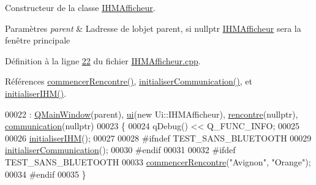 Constructeur de la classe \hyperlink{class_i_h_m_afficheur}{I\+H\+M\+Afficheur}. 


\begin{DoxyParams}{Paramètres}
{\em parent} & L\textquotesingle{}adresse de l\textquotesingle{}objet parent, si nullptr \hyperlink{class_i_h_m_afficheur}{I\+H\+M\+Afficheur} sera la fenêtre principale \\
\hline
\end{DoxyParams}


Définition à la ligne \hyperlink{_i_h_m_afficheur_8cpp_source_l00022}{22} du fichier \hyperlink{_i_h_m_afficheur_8cpp_source}{I\+H\+M\+Afficheur.\+cpp}.



Références \hyperlink{_i_h_m_afficheur_8cpp_source_l00090}{commencer\+Rencontre()}, \hyperlink{_i_h_m_afficheur_8cpp_source_l00074}{initialiser\+Communication()}, et \hyperlink{_i_h_m_afficheur_8cpp_source_l00056}{initialiser\+I\+H\+M()}.


\begin{DoxyCode}
00022                                           : \hyperlink{class_q_main_window}{QMainWindow}(parent), \hyperlink{class_i_h_m_afficheur_a26ca43f1ff87b1caa2191adcce444d23}{ui}(\textcolor{keyword}{new} Ui::IHMAfficheur), 
      \hyperlink{class_i_h_m_afficheur_aef34d340f7ea30f049a98efc47bd9779}{rencontre}(\textcolor{keyword}{nullptr}), \hyperlink{class_i_h_m_afficheur_a331b5544e96cc908336a1486b52c379b}{communication}(\textcolor{keyword}{nullptr})
00023 \{
00024     qDebug() << Q\_FUNC\_INFO;
00025 
00026     \hyperlink{class_i_h_m_afficheur_a119539fa51bf2e091e77faedf82eb146}{initialiserIHM}();
00027 
00028 \textcolor{preprocessor}{    #ifndef TEST\_SANS\_BLUETOOTH}
00029     \hyperlink{class_i_h_m_afficheur_ab7a8db8e7cfa6dc86ab59a07ede75298}{initialiserCommunication}();
00030 \textcolor{preprocessor}{    #endif}
00031 
00032 \textcolor{preprocessor}{    #ifdef TEST\_SANS\_BLUETOOTH}
00033     \hyperlink{class_i_h_m_afficheur_ad2dc0742d9cdda731a16c570fd6f2434}{commencerRencontre}(\textcolor{stringliteral}{"Avignon"}, \textcolor{stringliteral}{"Orange"});
00034 \textcolor{preprocessor}{    #endif}
00035 \}
\end{DoxyCode}
\mbox{\label{class_i_h_m_afficheur_aba47ddf68f3966ed8f5c697b48e352a4}} 
